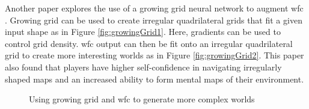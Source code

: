 Another paper explores the use of a growing grid neural network to augment \acrshort{wfc} \cite{WFC_Neural_Network}. Growing grid can be used to create irregular quadrilateral grids that fit a given input shape as in Figure \ref{fig:growingGrid1}. Here, gradients can be used to control grid density. \acrshort{wfc} output can then be fit onto an irregular quadrilateral grid to create more interesting worlds as in Figure \ref{fig:growingGrid2}. This paper also found that players have higher self-confidence in navigating irregularly shaped maps and an increased ability to form mental maps of their environment.

\begin{figure}[H]
    \centering
    \hfill
    \caption{Using growing grid and \acrshort{wfc} to generate more complex worlds \cite{WFC_Neural_Network}}
    \label{fig:growingGrid}
\end{figure}

